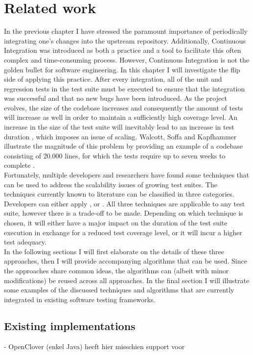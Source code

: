 
\chapter{Related work}
In the previous chapter I have stressed the paramount importance of periodically integrating one's changes into the upstream repository. Additionally, Continuous Integration was introduced as both a practice and a tool to facilitate this often complex and time-consuming process. However, Continuous Integration is not the golden bullet for software engineering. In this chapter I will investigate the flip side of applying this practice. After every integration, all of the unit and regression tests in the test suite must be executed to ensure that the integration was successful and that no new bugs have been introduced. As the project evolves, the size of the codebase increases and consequently the amount of tests will increase as well in order to maintain a sufficiently high coverage level. An increase in the size of the test suite will inevitably lead to an increase in test duration \cite{evaluationoftestsuiteminimization}, which imposes an issue of scaling. Walcott, Soffa and Kapfhammer illustrate the magnitude of this problem by providing an example of a codebase consisting of 20.000 lines, for which the tests require up to seven weeks to complete \cite{10.1145/1146238.1146240}.\\

\noindent Fortunately, multiple developers and researchers have found some techniques that can be used to address the scalability issues of growing test suites. The techniques currently known to literature can be classified in three categories. Developers can either apply \emph{\tsm{}}, \emph{\tcs{}} or \emph{\tcp{}} \cite{evaluationoftestsuiteminimization}. All three techniques are applicable to any test suite, however there is a trade-off to be made. Depending on which technique is chosen, it will either have a major impact on the duration of the test suite execution in exchange for a reduced test coverage level, or it will incur a higher test adequacy.\\

\noindent In the following sections I will first elaborate on the details of these three approaches, then I will provide accompanying algorithms that can be used. Since the approaches share common ideas, the algorithms can (albeit with minor modifications) be reused across all approaches. In the final section I will illustrate some examples of the discussed techniques and algorithms that are currently integrated in existing software testing frameworks.




\section{Existing implementations}
- OpenClover (enkel Java) heeft hier misschien support voor